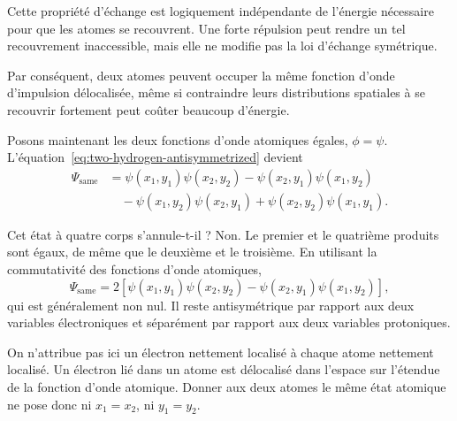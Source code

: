 Cette propriété d’échange est logiquement indépendante de l’énergie nécessaire pour que les atomes se recouvrent. Une forte répulsion peut rendre un tel recouvrement inaccessible, mais elle ne modifie pas la loi d’échange symétrique.

\begin{classroomqa}\end{classroomqa}

Par conséquent, deux atomes peuvent occuper la même fonction d’onde d’impulsion délocalisée, même si contraindre leurs distributions spatiales à se recouvrir fortement peut coûter beaucoup d’énergie.

Posons maintenant les deux fonctions d’onde atomiques égales, \(\phi=\psi\). L’équation~\eqref{eq:two-hydrogen-antisymmetrized} devient
\begin{align}
\Psi_{\mathrm{same}}
&=\psi(x_1,y_1)\psi(x_2,y_2)
-\psi(x_2,y_1)\psi(x_1,y_2)\nonumber\\
&\quad
-\psi(x_1,y_2)\psi(x_2,y_1)
+\psi(x_2,y_2)\psi(x_1,y_1).
\end{align}

Cet état à quatre corps s’annule-t-il ? Non. Le premier et le quatrième produits sont égaux, de même que le deuxième et le troisième. En utilisant la commutativité des fonctions d’onde atomiques,
\begin{equation}
\Psi_{\mathrm{same}}
=
2\left[
\psi(x_1,y_1)\psi(x_2,y_2)
-\psi(x_2,y_1)\psi(x_1,y_2)
\right],
\label{eq:same-hydrogen-state}
\end{equation}
qui est généralement non nul. Il reste antisymétrique par rapport aux deux variables électroniques et séparément par rapport aux deux variables protoniques.

On n’attribue pas ici un électron nettement localisé à chaque atome nettement localisé. Un électron lié dans un atome est délocalisé dans l’espace sur l’étendue de la fonction d’onde atomique. Donner aux deux atomes le même état atomique ne pose donc ni \(x_1=x_2\), ni \(y_1=y_2\).

